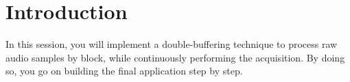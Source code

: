\section*{Introduction}

In this session, you will implement a double-buffering technique to process raw audio samples by block, while continuously performing the acquisition. By doing so, you go on building the final application step by step.
